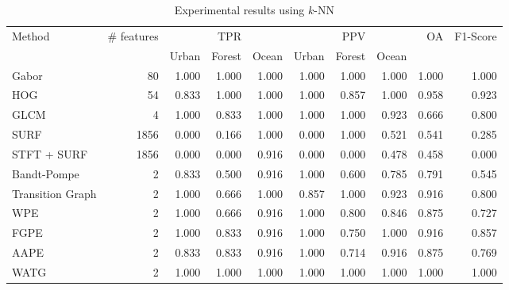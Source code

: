 \documentclass[journal]{IEEEtran}
\begin{document}
	\begin{table}[hbt]
		\centering
		\caption{Experimental results using $k$-NN}
		\label{tab:result1}
		\begin{tabular}{l*9{r}}
			\toprule
			\multirow{2}{*}{Method}      & \multirow{2}{*}{\# features}         &       & TPR   &       &       & PPV    &       & \multirow{2}{*}{OA}  & \multirow{2}{*}{F1-Score} \\ \cmidrule(lr){3-5} \cmidrule(lr){6-8}
			&   & Urban & Forest & Ocean & Urban & Forest & Ocean & &  \\ \cmidrule(lr){1-1}
			\cmidrule(lr){2-2}
			\cmidrule(lr){3-5}
			\cmidrule(lr){6-8}
			\cmidrule(lr){9-9}
			\cmidrule(lr){10-10}
			Gabor           & 80 & 1.000 & 1.000  & 1.000 & 1.000 & 1.000  & 1.000 & 1.000 & 1.000\\
			HOG           & 54 & 0.833 & 1.000  & 1.000 & 1.000 & 0.857  & 1.000 &  0.958 & 0.923\\
			GLCM            & 4 & 1.000 & 0.833  & 1.000 & 1.000 & 1.000  & 0.923 & 0.666 & 0.800\\
			SURF            & 1856 & 0.000 & 0.166  & 1.000 & 0.000 & 1.000  & 0.521 & 0.541 & 0.285\\
			STFT + SURF  & 1856 & 0.000 & 0.000  & 0.916 & 0.000 & 0.000  & 0.478 & 0.458 & 0.000\\ %
			\cmidrule(lr){1-1}
			\cmidrule(lr){2-2}
			\cmidrule(lr){3-5}
			\cmidrule(lr){6-8}
			\cmidrule(lr){9-9}
			\cmidrule(lr){10-10}
			Bandt-Pompe   & 2 & 0.833 &  0.500  & 0.916 & 1.000 & 0.600  & 0.785 & 0.791 &  0.545\\ 
			Transition Graph & 2  & 1.000 & 0.666  & 1.000 & 0.857 & 1.000  & 0.923 & 0.916 & 0.800 \\ %
			\cmidrule(lr){1-1}
			\cmidrule(lr){2-2}
			\cmidrule(lr){3-5}
			\cmidrule(lr){6-8}
			\cmidrule(lr){9-9}
			\cmidrule(lr){10-10}
			WPE   & 2 & 1.000 &  0.666  & 0.916 & 1.000 & 0.800  & 0.846 & 0.875 &  0.727\\ 
			FGPE   & 2 & 1.000 &  0.833  & 0.916 & 1.000 & 0.750  & 1.000 & 0.916 &  0.857\\ 
			AAPE   & 2 & 0.833 &  0.833  & 0.916 & 1.000 & 0.714  & 0.916 & 0.875 &  0.769\\ %
			\cmidrule(lr){1-1}
			\cmidrule(lr){2-2}
			\cmidrule(lr){3-5}
			\cmidrule(lr){6-8}
			\cmidrule(lr){9-9}
			\cmidrule(lr){10-10}
			WATG        & 2  & 1.000 & 1.000  & 1.000 & 1.000 & 1.000  & 1.000 & 1.000 & 1.000 \\ 
			\bottomrule
		\end{tabular}
	\end{table}
	
\end{document}
